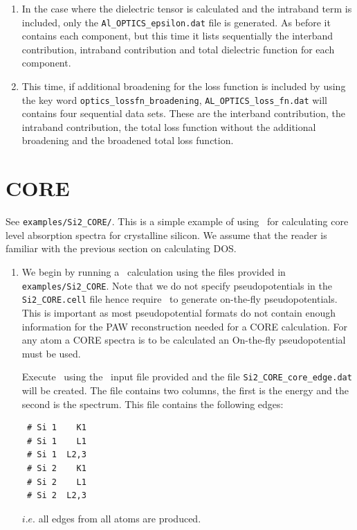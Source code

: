 \documentclass[a4paper,11pt,twoside]{book}
\begin{document}
{\begin{enumerate}
\item In the case where the dielectric tensor is calculated and the intraband term is included, only the \verb#Al_OPTICS_epsilon.dat#  file is generated.  As before it contains each component, but this time it lists sequentially the interband contribution, intraband contribution and total dielectric function for each component.

\item This time, if additional broadening for the loss function is included by using the key word \verb#optics_lossfn_broadening#, \verb#AL_OPTICS_loss_fn.dat# will contains four sequential data sets.  These are the interband contribution, the intraband contribution, the total loss function without the additional broadening and the broadened total loss function.
\end{enumerate}

\section{CORE}
See  \verb#examples/Si2_CORE/#. This is a simple example of using \optados\ for calculating core level absorption spectra for crystalline silicon.  We assume that the reader is familiar with the previous section on calculating DOS.
\begin{enumerate}
\item We begin by running a \castep\ calculation using the files provided in \verb#examples/Si2_CORE#.  Note that we do not specify pseudopotentials in the \verb#Si2_CORE.cell# file hence require \castep\ to generate on-the-fly pseudopotentials.  This is important as most pseudopotential formats do not contain enough information for the PAW reconstruction needed for a CORE calculation. For any atom a CORE spectra is to be calculated an On-the-fly pseudopotential must be used.

Execute \optados\ using the \optados\ input file provided and the file \verb#Si2_CORE_core_edge.dat# will be created.  The file contains two columns, the first is the energy and the second is the spectrum.  This file contains the following edges:

\begin{verbatim}
 # Si 1    K1
 # Si 1    L1
 # Si 1  L2,3
 # Si 2    K1
 # Si 2    L1
 # Si 2  L2,3
\end{verbatim}
$i.e.$ all edges from all atoms are produced.


\end{enumerate}}
\end{document}
